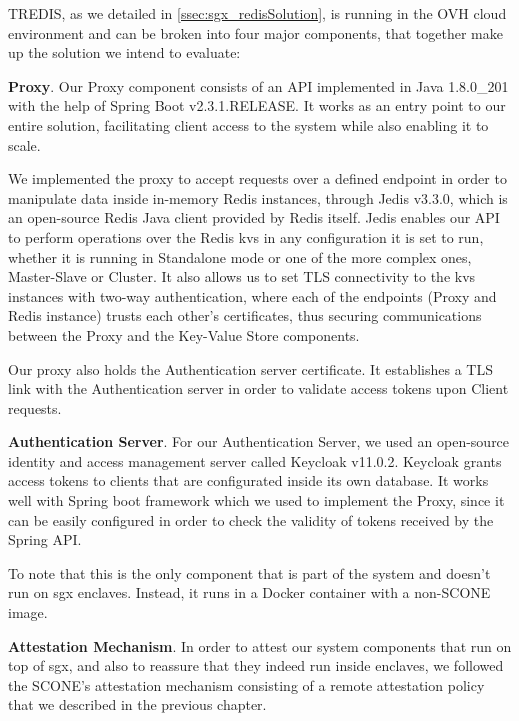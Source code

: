 TREDIS, as we detailed in \ref{ssec:sgx_redisSolution}, is running in the OVH cloud environment and can be broken into four major components, that together make up the solution we intend to evaluate:

\textbf{Proxy}. Our Proxy component consists of an API implemented in Java 1.8.0\_201 with the help of Spring Boot v2.3.1.RELEASE. It works as an entry point to our entire solution, facilitating client access to the system while also enabling it to scale. 

We implemented the proxy to accept requests over a defined endpoint in order to manipulate data inside in-memory Redis instances, through Jedis v3.3.0, which is an open-source Redis Java client provided by Redis itself. Jedis enables our API to perform operations over the Redis \gls{kvs} in any configuration it is set to run, whether it is running in Standalone mode or one of the more complex ones, Master-Slave or Cluster. It also allows us to set TLS connectivity to the \gls{kvs} instances with two-way authentication, where each of the endpoints (Proxy and Redis instance) trusts each other's certificates, thus securing communications between the Proxy and the Key-Value Store components.

Our proxy also holds the Authentication server certificate. It establishes a TLS link with the Authentication server in order to validate access tokens upon Client requests.

\vspace{3mm}
\textbf{Authentication Server}. For our Authentication Server, we used an open-source identity and access management server called Keycloak v11.0.2. Keycloak grants access tokens to clients that are configurated inside its own database. It works well with Spring boot framework which we used to implement the Proxy, since it can be easily configured in order to check the validity of tokens received by the Spring API.

To note that this is the only component that is part of the system and doesn't run on \gls{sgx} enclaves. Instead, it runs in a Docker container with a non-SCONE image.

\vspace{3mm}
\textbf{Attestation Mechanism}. In order to attest our system components that run on top of \gls{sgx}, and also to reassure that they indeed run inside enclaves, we followed the SCONE's attestation mechanism consisting of a remote attestation policy that we described in the previous chapter. 

